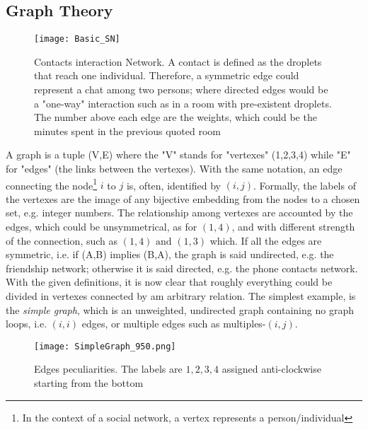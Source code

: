 \documentclass[a4paper,10pt,twoside]{book} %
\theoremstyle{definition}
\begin{document}
\subsection{Graph Theory}
\label{sec:GraphTheory}
\begin{figure}[htbp]
	\centering
	\texttt{[image: Basic\_SN]}
	\caption{Contacts interaction Network. A contact is defined as the droplets that reach one individual. Therefore, a symmetric edge could represent a chat among two persons; where directed edges would be a "one-way" interaction such as in a room with pre-existent droplets. The number above each edge are the weights, which could be the minutes spent in the previous quoted room}
	\label{fig:basicSN}
\end{figure}

A graph is a tuple (V,E) where the "V" stands for "vertexes" (1,2,3,4) while "E" for "edges" (the links between the vertexes).
With the same notation, an edge connecting the node\footnote{In the context of a social network, a vertex represents a person/individual} $i$ to $j$ is, often, identified by $(i,j)$.
Formally, the labels of the vertexes are the image of any bijective embedding from the nodes to a chosen set, e.g. integer numbers. The relationship among vertexes are accounted by the edges, which could be unsymmetrical, as for $(1,4)$, and with different strength of the connection, such as $(1,4) \text{ and } (1,3)$ which. If all the edges are symmetric, i.e. if (A,B) implies (B,A), the graph is said undirected, e.g. the friendship network; otherwise it is said directed, e.g. the phone contacts network. 
With the given definitions, it is now clear that roughly everything could be divided in vertexes connected by am arbitrary relation.
The simplest example, is the \textit{simple graph}, which is an unweighted, undirected graph containing no graph loops, i.e. $(i,i)$ edges, or multiple edges such as multiples-$(i,j)$.
\begin{figure}[ht]
	\texttt{[image: SimpleGraph\_950.png]}
	\caption{Edges peculiarities. The labels are $1,2,3,4$ assigned anti-clockwise starting from the bottom}
	\label{fig:simple}
\end{figure}
\newpage
\end{document}
